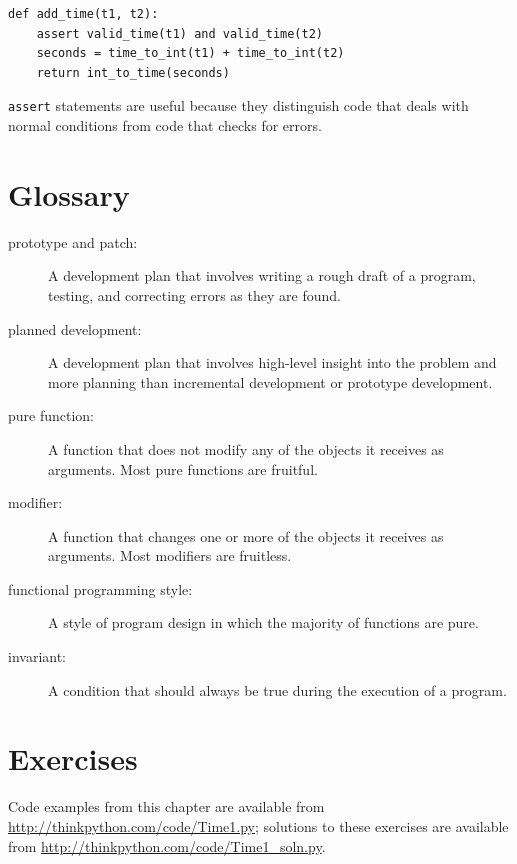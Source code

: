 \documentclass[10pt]{book}
\begin{document}
\begin{verbatim}
def add_time(t1, t2):
    assert valid_time(t1) and valid_time(t2)
    seconds = time_to_int(t1) + time_to_int(t2)
    return int_to_time(seconds)
\end{verbatim}
%
{\tt assert} statements are useful because they distinguish
code that deals with normal conditions from code
that checks for errors.


\section{Glossary}

\begin{description}

\item[prototype and patch:] A development plan that involves
writing a rough draft of a program, testing, and correcting errors as
they are found.

\item[planned development:] A development plan that involves
high-level insight into the problem and more planning than incremental
development or prototype development.

\item[pure function:] A function that does not modify any of the objects it
receives as arguments.  Most pure functions are fruitful.

\item[modifier:] A function that changes one or more of the objects it
receives as arguments.  Most modifiers are fruitless.

\item[functional programming style:] A style of program design in which the
majority of functions are pure.

\item[invariant:] A condition that should always be true during the
execution of a program.

\end{description}


\section{Exercises}

Code examples from this chapter are available from
\url{http://thinkpython.com/code/Time1.py}; solutions to these
exercises are available from \url{http://thinkpython.com/code/Time1_soln.py}.
\end{document}
